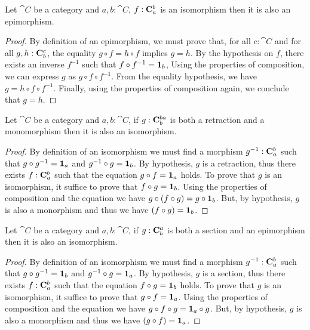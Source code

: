 \documentclass[12pt]{article}
\begin{document}
\begin{lemma}
    Let \(\cat{C}\) be a category and \(a,b:\cat{C}\), \(f : \morphs{C} {a} {b}\) 
    is an isomorphism then it is also an epimorphism.
\end{lemma}
\begin{proof}
By definition of an epimorphism, we must prove that, for all \(c:\cat{C}\) and for all \(g, h:\morphs{C}{b}{c}\),
the equality \(g \circ f = h \circ f\) implies \(g = h\).
By the hypothesis on \(f\), there exists an inverse \(f^{-1}\) such that \(f\circ f^{-1} = \idarrow[b]\), Using the properties of composition, we can express \(g\) as \(g \circ f \circ f^{-1}\).
From the equality hypothesis, we have \(g = h \circ f \circ f^{-1}\).
Finally, using the properties of composition again, we conclude that $g = h$.
\end{proof}
\begin{lemma} 
    Let \(\cat{C}\) be a category and \(a,b:\cat{C}\), if \(g : \morphs{C} {b} {b
    a}\) is both a retraction and a monomorphism then it is also an isomorphism. 
\end{lemma}
\begin{proof}
    By definition of an isomorphism we must find a morphism \(g^{-1} : \morphs{C}{a}{b}\) such that \(g \circ g^{-1} = \idarrow[a]\) and \(g^{-1} \circ g = \idarrow[b]\).
    By hypothesis, \(g\) is a retraction, thus there exists \(f : \morphs{C}{a}{b}\) such that the equation \(g \circ f = \idarrow[a]\) holds. To prove that \(g\) is an isomorphism, it suffice to prove that \(f \circ g = \idarrow[b]\). Using the properties of composition and the equation we have   
    \( g \circ (f \circ g) = g \circ \idarrow[b]\).
    But, by hypothesis, \(g\) is also a monorphism and thus we have
    \((f \circ g) = \idarrow[b]\).
\end{proof}

\begin{lemma} 
    Let \(\cat{C}\) be a category and \(a,b:\cat{C}\), if \(g : \morphs{C} {b} {a}\) is both a section and an epimorphism then it is also an isomorphism. 
\end{lemma}
\begin{proof}
    By definition of an isomorphism we must find a morphism \(g^{-1} : \morphs{C}{a}{b}\) such that \(g \circ g^{-1} = \idarrow[b]\) and \(g^{-1} \circ g = \idarrow[a]\).
    By hypothesis, \(g\) is a section, thus there exists \(f : \morphs{C}{a}{b}\) such that the equation \(f \circ g = \idarrow[b]\) holds. To prove that \(g\) is an isomorphism, it suffice to prove that \(g \circ f = \idarrow[a]\). Using the properties of composition and the equation we have   
    \( g \circ f \circ g = \idarrow[a] \circ g\).
    But, by hypothesis, \(g\) is also a monorphism and thus we have
    \((g \circ f) = \idarrow[a]\).
\end{proof}
\end{document}

